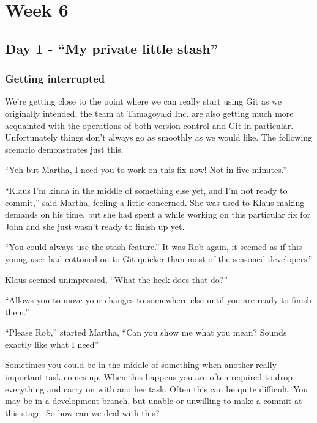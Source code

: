 \cleardoublepage
\chapter{Week 6}

\section{Day 1 - ``My private little stash''}
\subsection{Getting interrupted}

We're getting close to the point where we can really start using Git as we originally intended, the team at Tamagoyaki Inc.
are also getting much more acquainted with the operations of both version control and Git in particular.
Unfortunately things don't always go as smoothly as we would like.
The following scenario demonstrates just this.

\begin{trenches}
``Yeh but Martha, I need you to work on this fix now! Not in five minutes.''

``Klaus I'm kinda in the middle of something else yet, and I'm not ready to commit,'' said Martha, feeling a little concerned.
She was used to Klaus making demands on his time, but she had spent a while working on this particular fix for John and she just wasn't ready to finish up yet.

``You could always use the stash feature.''
It was Rob again, it seemed as if this young user had cottoned on to Git quicker than most of the seasoned developers.''

Klaus seemed unimpressed, ``What the heck does that do?''

``Allows you to move your changes to somewhere else until you are ready to finish them.''

``Please Rob,'' started Martha,
``Can you show me what you mean? Sounds exactly like what I need''
\end{trenches}

Sometimes you could be in the middle of something when another really important task comes up.
When this happens you are often required to drop everything and carry on with another task.
Often this can be quite difficult.
You may be in a development branch, but unable or unwilling to make a commit at this stage.
So how can we deal with this?

